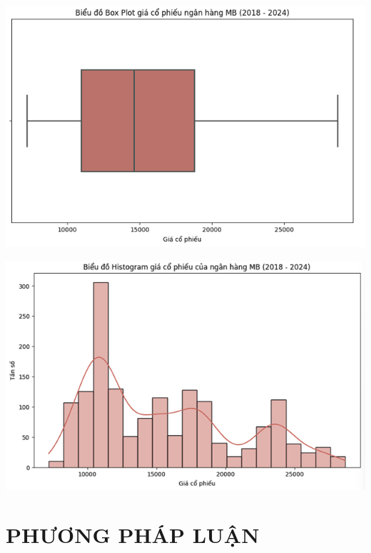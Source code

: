 \documentclass[conference]{IEEEtran}
\begin{document}
\begin{minipage}{0.21\textwidth}
    \centering
    \includegraphics[width=\linewidth]{images/Statistic/mbb_boxplot.png}
    \label{fig:image1}
\end{minipage}
\hfill
\begin{minipage}{0.21\textwidth}
    \centering
    \includegraphics[width=\linewidth]{images/Statistic/mbb_histogram.png}
    \label{fig:image2}
\end{minipage}



\section{PHƯƠNG PHÁP LUẬN}
\end{document}
